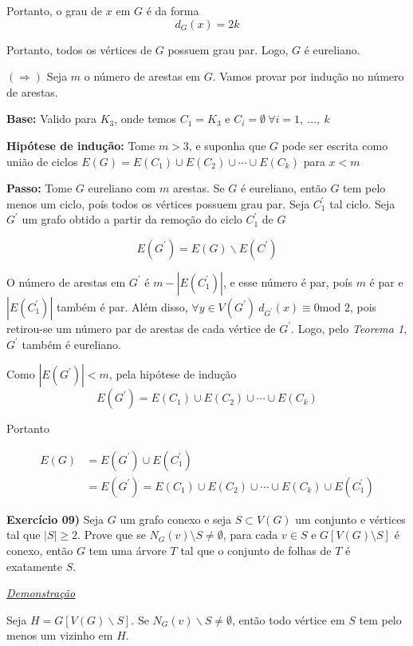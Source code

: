 \documentclass[12pt, a4paper]{article}
\begin{document}
  Portanto, o grau de $x$ em $G$ é da forma
  $$d_G(x) = 2k$$

  Portanto, todos os vértices de $G$ possuem grau par. Logo, $G$ é eureliano.
  
  $(\Rightarrow)$ Seja $m$ o número de arestas em $G$. Vamos provar por indução
  no número de arestas.

  \textbf{Base:}
  Valido para $K_3$, onde temos $C_1 = K_3$ e $C_i = \emptyset \  \forall i=1, \ \hdots, \ k$ 
  
  \textbf{Hipótese de indução:} Tome $m > 3$, e suponha que $G$ pode ser
  escrita como união de ciclos $E(G) =
  E(C_{1}) \cup E(C_{2}) \cup \cdots \cup E(C_{k})$ para $x < m$
  
  \textbf{Passo:} Tome $G$ eureliano com $m$ arestas. Se $G$ é eureliano,
  então $G$ tem pelo menos um ciclo, poís todos os vértices possuem grau
  par. Seja $C_1^{'}$ tal ciclo. Seja $G^{'}$ um grafo obtido a partir da remoção
  do ciclo $C_1^{'}$ de $G$

  $$E(G^{'}) = E(G) \backslash E(C^{'})$$

  O número de arestas em $G^{'}$ é $m-|E(C_1^{'})|$, e esse número é par, poís
  $m$ é par e $|E(C_1^{'})|$ também é par. Além disso, 
  $\forall y \in V(G^{'})\ d_{G^{'}}(x) \equiv 0 \text{mod 2}$, pois retirou-se
  um número par de arestas de cada vértice de $G^{'}$. Logo, pelo \textit{Teorema 1},
  $G^{'}$ também é eureliano.

  Como $|E(G^{'})| < m$, pela hipótese de indução
  $$E(G^{'}) = E(C_{1}) \cup E(C_{2}) \cup \cdots \cup E(C_{k})$$

  Portanto 

  \begin{align}
    E(G) &= E(G^{'}) \cup E(C_1^{'}) \\
         &= E(G^{'}) = E(C_{1}) \cup E(C_{2}) \cup \cdots \cup E(C_{k}) \cup E(C_1^{'})
  \end{align}


  \newpage

\textbf{Exercício 09)} Seja $G$ um grafo conexo e seja $S\subset V(G)$ um conjunto e vértices tal que $|S|\geq 2$. Prove que se $N_G(v)\setminus S\neq \emptyset$, para cada $v\in S$ e $G[V(G)\setminus S]$ é conexo, então $G$ tem uma árvore $T$ tal que o conjunto de folhas de $T$ é exatamente $S$.

  \vspace{0.5cm}
  \textit{\underline{Demonstração}}

  Seja $H = G[V(G)\backslash S]$. Se $N_G(v)\backslash S \ne \emptyset$, então todo vértice
  em $S$ tem pelo menos um vizinho em $H$.
\end{document}
